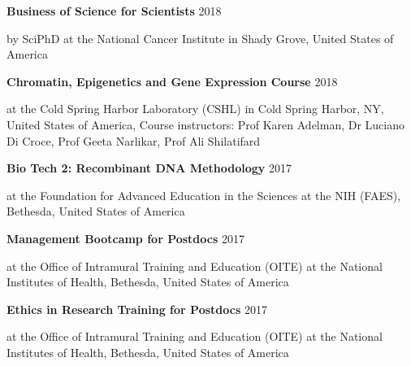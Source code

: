 \documentclass[margin,line]{res}
\begin{document}
\begin{resume}
\vspace*{-2mm}

{\bf Business of Science for Scientists} \hfill {2018}\\
\vspace*{-3.5mm}
\begin{addmargin}[0pt]{.1\linewidth}
\vspace*{-1mm}
by SciPhD at the National Cancer Institute in Shady Grove, United States of America
\end{addmargin}

\vspace*{-2mm}

{\bf Chromatin, Epigenetics and Gene Expression Course} \hfill {2018}\\
\vspace*{-3.5mm}
\begin{addmargin}[0pt]{.1\linewidth}
\vspace*{-1mm}
at the Cold Spring Harbor Laboratory (CSHL) in Cold Spring Harbor, NY, United States of America, Course instructors: Prof Karen Adelman, Dr Luciano Di Croce, Prof Geeta Narlikar, Prof Ali Shilatifard
\end{addmargin}

\vspace*{-2mm}

{\bf Bio Tech 2: Recombinant DNA Methodology} \hfill {2017}\\
\vspace*{-3.5mm}
\begin{addmargin}[0pt]{.1\linewidth}
\vspace*{-1mm}
at the Foundation for Advanced Education in the Sciences at the NIH (FAES), Bethesda, United States of America
\end{addmargin}

\vspace*{-2mm}

{\bf Management Bootcamp for Postdocs} \hfill {2017}\\
\vspace*{-3.5mm}
\begin{addmargin}[0pt]{.1\linewidth}
\vspace*{-1mm}
at the Office of Intramural Training and Education (OITE) at the National Institutes of Health, Bethesda, United States of America
\end{addmargin}

\vspace*{-2mm}

{\bf Ethics in Research Training for Postdocs} \hfill {2017}\\
\vspace*{-3.5mm}
\begin{addmargin}[0pt]{.1\linewidth}
\vspace*{-1mm}
at the Office of Intramural Training and Education (OITE) at the National Institutes of Health, Bethesda, United States of America
\end{addmargin}


\end{resume}
\end{document}
